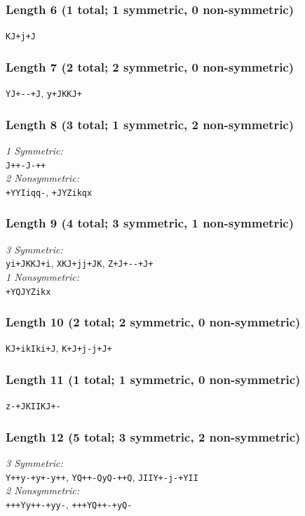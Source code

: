 \documentclass[12pt]{article}
\numberwithin{equation}{section}
\begin{document}
\subsubsection*{Length 6 (1 total; 1 symmetric, 0 non-symmetric)}
\raggedright
\verb|KJ+j+J|
\subsubsection*{Length 7 (2 total; 2 symmetric, 0 non-symmetric)}
\raggedright
\verb|YJ+--+J|, \verb|y+JKKJ+|
\subsubsection*{Length 8 (3 total; 1 symmetric, 2 non-symmetric)}
\raggedright
\emph{1 Symmetric:}\\
\verb|J++-J-++|
\\[0.5\baselineskip]
\emph{2 Nonsymmetric:}\\
\verb|+YYIiqq-|, \verb|+JYZikqx|\\
\subsubsection*{Length 9 (4 total; 3 symmetric, 1 non-symmetric)}
\raggedright
\emph{3 Symmetric:}\\
\verb|yi+JKKJ+i|, \verb|XKJ+jj+JK|, \verb|Z+J+--+J+|
\\[0.5\baselineskip]
\emph{1 Nonsymmetric:}\\
\verb|+YQJYZikx|\\
\subsubsection*{Length 10 (2 total; 2 symmetric, 0 non-symmetric)}
\raggedright
\verb|KJ+ikIki+J|, \verb|K+J+j-j+J+|
\subsubsection*{Length 11 (1 total; 1 symmetric, 0 non-symmetric)}
\raggedright
\verb|z-+JKIIKJ+-|
\subsubsection*{Length 12 (5 total; 3 symmetric, 2 non-symmetric)}
\raggedright
\emph{3 Symmetric:}\\
\verb|Y++y-+y+-y++|, \verb|YQ++-QyQ-++Q|, \verb|JIIY+-j-+YII|
\\[0.5\baselineskip]
\emph{2 Nonsymmetric:}\\
\verb|+++Yy++-+yy-|, \verb|+++YQ++-+yQ-|\\
\end{document}
